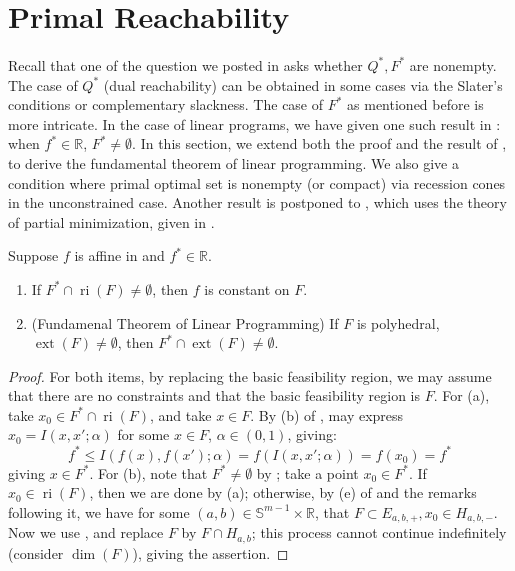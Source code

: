 \section{Primal Reachability}
\label{sect:045}

\paragraph{}Recall that one of the question we posted in  asks whether $Q^\ast,F^\ast$ are nonempty. The case of $Q^\ast$ (dual reachability) can be obtained in some cases via the Slater's conditions or complementary slackness. The case of $F^\ast$ as mentioned before is more intricate. In the case of linear programs, we have given one such result in : when $f^\ast\in \mathbb{R}$, $F^\ast\neq\emptyset$. In this section, we extend both the proof and the result of , to derive the fundamental theorem of linear programming. We also give a condition where primal optimal set is nonempty (or compact) via recession cones in the unconstrained case. Another result is postponed to , which uses the theory of partial minimization, given in .

\begin{prop}\label{prop:045-linear-primal-optimality}
	Suppose $f$ is affine in  and $f^\ast\in \mathbb{R}$.
	\begin{enumerate}[label=(\alph*)]
		\item If $F^\ast \cap \operatorname{ri}(F)\neq\emptyset$, then $f$ is constant on $F$.
		\item (Fundamenal Theorem of Linear Programming) If $F$ is polyhedral, $\operatorname{ext}(F)\neq\emptyset$, then $F^\ast\cap\operatorname{ext}(F)\neq\emptyset$.
	\end{enumerate}
\end{prop}

\begin{proof}
	For both items, by replacing the basic feasibility region, we may assume that there are no constraints and that the basic feasibility region is $F$. For (a), take $x_0\in F^\ast \cap \operatorname{ri}(F)$, and take $x\in F$. By (b) of , may express $x_0=I(x,x'; \alpha )$ for some $x\in F$, $\alpha \in (0,1)$, giving:
	\[
		f^\ast \leq I(f(x),f(x');\alpha )=f(I(x,x';\alpha ))=f(x_0)=f^\ast
	\]
	giving $x\in F^\ast$. For (b), note that $F^\ast\neq\emptyset$ by ; take a point $x_0\in F^\ast$. If $x_0\in \operatorname{ri}(F)$, then we are done by (a); otherwise, by (e) of  and the remarks following it, we have for some $(a,b)\in \mathbb{S}^{m-1}\times \mathbb{R}$, that $F\subset E_{a,b,+},x_0\in H_{a,b,-}$. Now we use , and replace $F$ by $F\cap H_{a,b}$; this process cannot continue indefinitely (consider $\dim(F)$), giving the assertion.
\end{proof}

